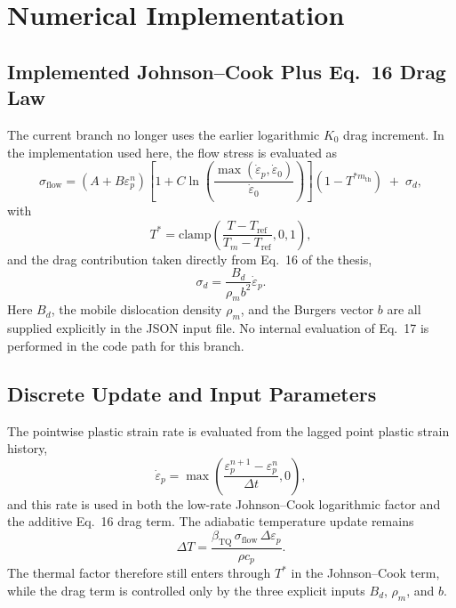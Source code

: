 \section{Numerical Implementation}

\subsection{Implemented Johnson--Cook Plus Eq.~16 Drag Law}
The current branch no longer uses the earlier logarithmic $K_0$ drag increment. In the implementation used here, the flow stress is evaluated as
\begin{equation}
\sigma_{\mathrm{flow}} =
\left(A+B\varepsilon_p^n\right)
\left[1+C\ln\left(\frac{\max(\dot{\varepsilon}_p,\dot{\varepsilon}_0)}{\dot{\varepsilon}_0}\right)\right]
\left(1-T^{*m_{\mathrm{th}}}\right)
\;+\;
\sigma_d,
\end{equation}
with
\begin{equation}
T^*=\mathrm{clamp}\left(\frac{T-T_{\mathrm{ref}}}{T_m-T_{\mathrm{ref}}},0,1\right),
\end{equation}
and the drag contribution taken directly from Eq.~16 of the thesis,
\begin{equation}
\sigma_d = \frac{B_d}{\rho_m b^2}\dot{\varepsilon}_p.
\end{equation}
Here $B_d$, the mobile dislocation density $\rho_m$, and the Burgers vector $b$ are all supplied explicitly in the JSON input file. No internal evaluation of Eq.~17 is performed in the code path for this branch.

\subsection{Discrete Update and Input Parameters}
The pointwise plastic strain rate is evaluated from the lagged point plastic strain history,
\begin{equation}
\dot{\varepsilon}_p = \max\left(\frac{\varepsilon_p^{n+1}-\varepsilon_p^n}{\Delta t},0\right),
\end{equation}
and this rate is used in both the low-rate Johnson--Cook logarithmic factor and the additive Eq.~16 drag term. The adiabatic temperature update remains
\begin{equation}
\Delta T = \frac{\beta_{\mathrm{TQ}}\,\sigma_{\mathrm{flow}}\,\Delta\varepsilon_p}{\rho c_p}.
\end{equation}
The thermal factor therefore still enters through $T^*$ in the Johnson--Cook term, while the drag term is controlled only by the three explicit inputs $B_d$, $\rho_m$, and $b$.

